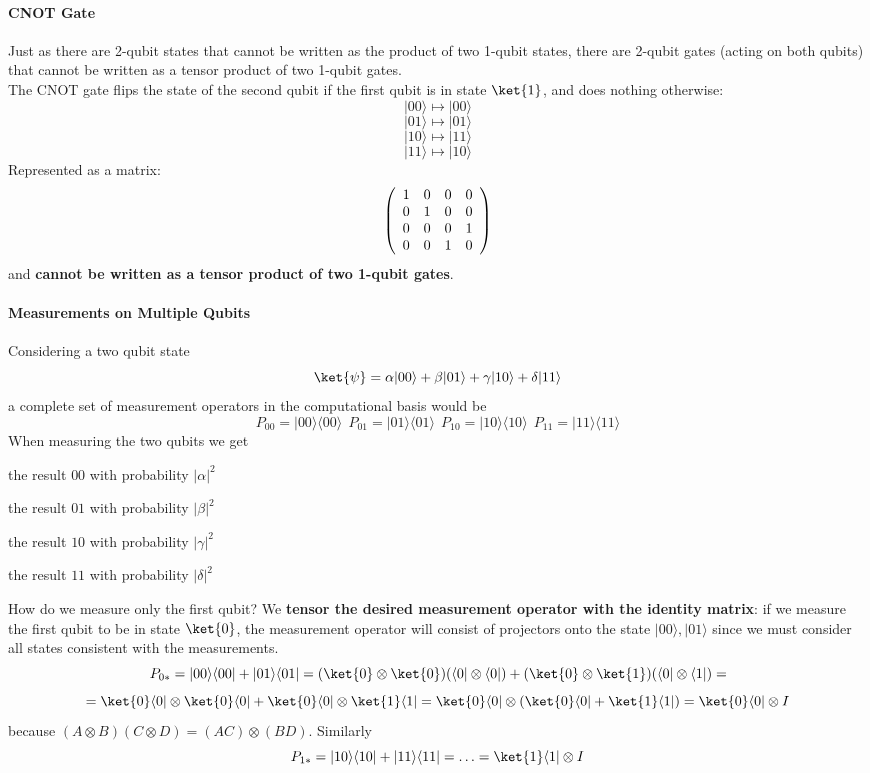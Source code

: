 \documentclass[10pt]{report}
\begin{document}
\paragraph{CNOT Gate} Just as there are 2-qubit states that cannot be written as the product of two 1-qubit states, there are 2-qubit gates (acting on both qubits) that cannot be written as a tensor product of two 1-qubit gates.\\
The CNOT gate flips the state of the second qubit if the first qubit is in state $\ket{1}$, and does nothing otherwise:
$$|00\rangle\mapsto|00\rangle$$
$$|01\rangle\mapsto|01\rangle$$
$$|10\rangle\mapsto|11\rangle$$
$$|11\rangle\mapsto|10\rangle$$
Represented as a matrix:
$$\left(\begin{array}{c c c c}
1&0&0&0\\
0&1&0&0\\
0&0&0&1\\
0&0&1&0
\end{array}\right)$$
and \textbf{cannot be written as a tensor product of two 1-qubit gates}.
\paragraph{Measurements on Multiple Qubits} Considering a two qubit state
$$\ket{\psi}=\alpha|00\rangle+\beta|01\rangle+\gamma|10\rangle+\delta|11\rangle$$
a complete set of measurement operators in the computational basis would be 
$$P_{00} = |00\rangle\langle00\rangle\:\:P_{01} = |01\rangle\langle01\rangle\:\:P_{10} = |10\rangle\langle10\rangle\:\:P_{11} = |11\rangle\langle11\rangle$$
When measuring the two qubits we get\begin{list}{}{}
	\item the result $00$ with probability $|\alpha|^2$
	\item the result $01$ with probability $|\beta|^2$
	\item the result $10$ with probability $|\gamma|^2$
	\item the result $11$ with probability $|\delta|^2$
\end{list}
How do we measure only the first qubit? We \textbf{tensor the desired measurement operator with the identity matrix}: if we measure the first qubit to be in state $\ket{0}$, the measurement operator will consist of projectors onto the state $|00\rangle,|01\rangle$ since we must consider all states consistent with the measurements.
$$P_{0*} = |00\rangle\langle00| + |01\rangle\langle01| = (\ket{0}\otimes\ket{0})(\langle0|\otimes\langle0|) + (\ket{0}\otimes\ket{1})(\langle0|\otimes\langle1|) =$$
$$=\ket{0}\langle0|\otimes\ket{0}\langle0|+\ket{0}\langle0|\otimes\ket{1}\langle1| = \ket{0}\langle0|\otimes(\ket{0}\langle0|+\ket{1}\langle1|) = \ket{0}\langle0|\otimes I$$
because $(A\otimes B)(C\otimes D) = (AC)\otimes(BD)$. Similarly
$$P_{1*} = |10\rangle\langle10|+|11\rangle\langle11| = \ldots = \ket{1}\langle1|\otimes I$$
\pagebreak
\end{document}
